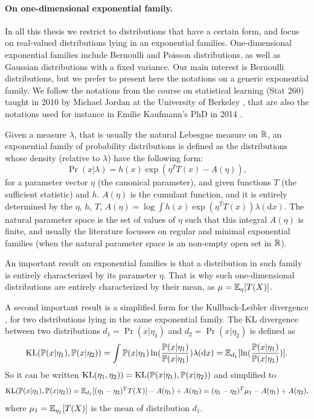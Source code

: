 
\paragraph{On one-dimensional exponential family.}
%

In all this thesis we restrict to distributions that have a certain form, and focus on real-valued distributions lying in an exponential families.
One-dimensional exponential families include Bernoulli and Poisson distributions, as well as Gaussian distributions with a fixed variance.
Our main interest is Bernoulli distributions, but we prefer to present here the notations on a generic exponential family.
We follow the notations from the course on statistical learning (Stat 260) taught in 2010 by Michael Jordan at the University of Berkeley \cite{JordanCourseStatBerkeley}, that are also the notations used for instance in Emilie Kaufmann's PhD in 2014 \cite{Kaufmann12PhD}.

Given a measure $\lambda$, that is usually the natural Lebesgue measure on $\mathbb{R}$, an exponential family of probability distributions is defined as the distributions whose density (relative to $\lambda$) have the following form:
\[ \Pr(x | \lambda) = h(x) \exp(\eta^T T(x) - A(\eta)), \]
for a parameter vector $\eta$ (the canonical parameter), and given functions $T$ (the sufficient statistic) and $h$.
$A(\eta)$ is the cumulant function, and it is entirely determined by the $\eta$, $h$, $T$,
$A(\eta) = \log \int h(x) \exp(\eta^T T(x)) \lambda(\mathrm{d} x)$.
%
The natural parameter space is the set of values of $\eta$ such that this integral $A(\eta)$ is finite,
and usually the literature focusses on regular and minimal exponential families (when the natural parameter space is an non-empty open set in $\mathbb{R}$).

An important result on exponential families is that a distribution in such family is entirely characterized by its parameter $\eta$.
That is why such one-dimensional distributions are entirely characterized by their mean, as $\mu = \mathbb{E}_{\eta}[T(X)]$.

A second important result is a simplified form for the Kullback-Leibler divergence \cite{KullbackLeibler51}, for two distributions lying in the same exponential family.
The KL divergence between two distributions $d_1=\Pr(x|\eta_1)$ and $d_2=\Pr(x|\eta_2)$ is defined as
\[ \mathrm{KL}(\mathbb{P}(x|\eta_1), \mathbb{P}(x|\eta_2)) = \int \mathbb{P}(x|\eta_1) \ln(\frac{\mathbb{P}(x|\eta_1)}{\mathbb{P}(x|\eta_1)}) \lambda(\mathrm{d}x) = \mathbb{E}_{d_1}[ \ln(\frac{\mathbb{P}(x|\eta_1)}{\mathbb{P}(x|\eta_1)}) ]. \]
%
So it can be written $\mathrm{KL}( \eta_1,  \eta_2)) = \mathrm{KL}(\mathbb{P}(x|\eta_1), \mathbb{P}(x|\eta_2))$ and simplified to
\[ \mathrm{KL}(\mathbb{P}(x|\eta_1), \mathbb{P}(x|\eta_2)) = \mathbb{E}_{d_1}[ (\eta_1 - \eta_2)^T T(X) ] - A(\eta_1) + A(\eta_2) = (\eta_1 - \eta_2)^T \mu_1 - A(\eta_1) + A(\eta_2), \]
where $\mu_1 = \mathbb{E}_{\eta_1}[T(X)]$ is the mean of distribution $d_1$.


